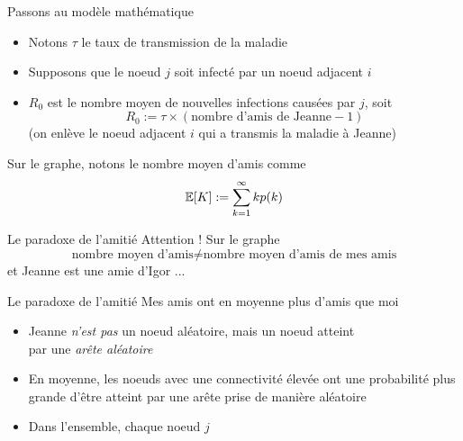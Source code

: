 \documentclass[10pt]{beamer}
\begin{document}
\begin{frame}{Passons au modèle mathématique}
  \begin{itemize}
    \item Notons $\tau$ le taux de transmission de la maladie
    \item Supposons que le noeud $j$ soit infecté par un noeud adjacent $i$
    \item $R_0$ est le nombre moyen de nouvelles infections causées par $j$,
      soit
      \[
        R_0 := \tau \times (\text{nombre d'amis de Jeanne} - 1 )
      \]
      (on enlève le noeud adjacent $i$ qui a transmis la maladie à Jeanne)
  \end{itemize}

  \vspace{.5cm}
  Sur le graphe, notons le nombre moyen d'amis comme
  \[
    \mathbb{E}[K] := \sum_{k=1}^\infty k p(k)
  \]
\end{frame}

\begin{frame}{Le paradoxe de l'amitié}
  Attention ! Sur le graphe
  \[
    \text{nombre moyen d'amis} \neq \text{nombre moyen d'amis de mes amis}
  \]
  et Jeanne est une amie d'Igor ...
  \pause

  \begin{block}{Le paradoxe de l'amitié}
    Mes amis ont en moyenne plus d'amis que moi
  \end{block}
  {\footnotesize
    \begin{itemize}
      \item Jeanne \emph{n'est pas} un noeud aléatoire, mais un noeud atteint \\
        par une \emph{arête aléatoire}
      \item En moyenne, les noeuds avec une connectivité élevée ont une probabilité plus grande
        d'être atteint par une arête prise de manière aléatoire
      \item Dans l'ensemble, chaque noeud $j$
  \end{itemize}
  }

\end{frame}
\end{document}
